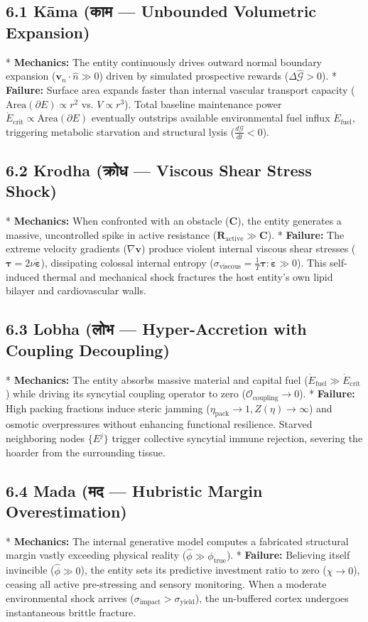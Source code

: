 \documentclass[11pt,a4paper]{article}
\theoremstyle{definition}
\theoremstyle{remark}
\begin{document}
\subsection{6.1 Kāma (काम — Unbounded Volumetric Expansion)}
* \textbf{Mechanics:} The entity continuously drives outward normal boundary expansion ($\mathbf{v}_n \cdot \hat{n} \gg 0$) driven by simulated prospective rewards ($\Delta \hat{\mathcal{G}} > 0$).
* \textbf{Failure:} Surface area expands faster than internal vascular transport capacity ($\mathrm{Area}(\partial E) \propto r^2$ vs. $V \propto r^3$). Total baseline maintenance power $\dot{E}_{\text{crit}} \propto \mathrm{Area}(\partial E)$ eventually outstrips available environmental fuel influx $\dot{E}_{\text{fuel}}$, triggering metabolic starvation and structural lysis ($\frac{d\mathcal{G}}{dt} < 0$).

\subsection{6.2 Krodha (क्रोध — Viscous Shear Stress Shock)}
* \textbf{Mechanics:} When confronted with an obstacle ($\mathbf{C}$), the entity generates a massive, uncontrolled spike in active resistance ($\mathbf{R}_{\text{active}} \gg \mathbf{C}$).
* \textbf{Failure:} The extreme velocity gradients ($\nabla \mathbf{v}$) produce violent internal viscous shear stresses ($\boldsymbol{\tau} = 2\nu \dot{\boldsymbol{\varepsilon}}$), dissipating colossal internal entropy ($\sigma_{\text{viscous}} = \frac{1}{T}\boldsymbol{\tau}:\dot{\boldsymbol{\varepsilon}} \gg 0$). This self-induced thermal and mechanical shock fractures the host entity's own lipid bilayer and cardiovascular walls.

\subsection{6.3 Lobha (लोभ — Hyper-Accretion with Coupling Decoupling)}
* \textbf{Mechanics:} The entity absorbs massive material and capital fuel ($\dot{E}_{\text{fuel}} \gg \dot{E}_{\text{crit}}$) while driving its syncytial coupling operator to zero ($\mathcal{O}_{\text{coupling}} \to 0$).
* \textbf{Failure:} High packing fractions induce steric jamming ($\eta_{\text{pack}} \to 1, Z(\eta) \to \infty$) and osmotic overpressures without enhancing functional resilience. Starved neighboring nodes $\{E^j\}$ trigger collective syncytial immune rejection, severing the hoarder from the surrounding tissue.

\subsection{6.4 Mada (मद — Hubristic Margin Overestimation)}
* \textbf{Mechanics:} The internal generative model computes a fabricated structural margin vastly exceeding physical reality ($\hat{\phi} \gg \phi_{\text{true}}$).
* \textbf{Failure:} Believing itself invincible ($\hat{\phi} \gg 0$), the entity sets its predictive investment ratio to zero ($\chi \to 0$), ceasing all active pre-stressing and sensory monitoring. When a moderate environmental shock arrives ($\sigma_{\text{impact}} > \sigma_{\text{yield}}$), the un-buffered cortex undergoes instantaneous brittle fracture.
\end{document}
